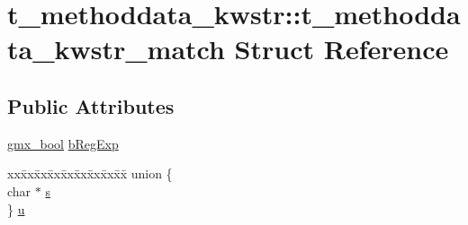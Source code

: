 \hypertarget{structt__methoddata__kwstr_1_1t__methoddata__kwstr__match}{\section{t\-\_\-methoddata\-\_\-kwstr\-:\-:t\-\_\-methoddata\-\_\-kwstr\-\_\-match \-Struct \-Reference}
\label{structt__methoddata__kwstr_1_1t__methoddata__kwstr__match}
}
\subsection*{\-Public \-Attributes}
\begin{DoxyCompactItemize}
\item 
\hyperlink{include_2types_2simple_8h_a8fddad319f226e856400d190198d5151}{gmx\-\_\-bool} \hyperlink{structt__methoddata__kwstr_1_1t__methoddata__kwstr__match_a961df7251251de55c84b0a9527f4dd22}{b\-Reg\-Exp}
\item 
\begin{tabbing}
xx\=xx\=xx\=xx\=xx\=xx\=xx\=xx\=xx\=\kill
union \{\\
\>char $\ast$ \hyperlink{structt__methoddata__kwstr_1_1t__methoddata__kwstr__match_ab62386848903180c1b925c5e8e69c751}{s}\\
\} \hyperlink{structt__methoddata__kwstr_1_1t__methoddata__kwstr__match_ac16e8a7239d083c12c4ccc5caa628f71}{u}\\

\end{tabbing}\end{DoxyCompactItemize}


